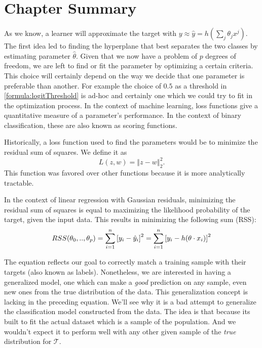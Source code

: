 \section{Chapter Summary}\label{section-ch_machine_learning_summary}


As we know, a learner will approximate the target with $y \approx \hat{y} = h\left(\sum_{j}\theta_j x^j\right)$. The first idea led to finding the hyperplane that best separates the two classes by estimating parameter $\hat{\theta}$. Given that we now have a problem of $p$ degrees of freedom, we are left to find or fit the parameter by optimizing a certain criteria. This choice will certainly depend on the way we decide that one parameter is preferable than another. For example the choice of $0.5$ as a threshold in \cref{formula:logitThreshold} is ad-hoc and certainly one which we could try to fit in the optimization process. In the context of machine learning, loss functions give a quantitative measure of a parameter's performance. In the context of binary classification, these are also known as scoring functions.

Historically, a loss function used to find the parameters would be to minimize the residual sum of squares.
We define it as $$L(z,w) = \left\Vert z-w \right\Vert^2_2 .$$
This function was favored over other functions because it is more analytically tractable.

In the context of linear regression with Gaussian residuals, minimizing the residual sum of squares is equal to maximizing the likelihood probability of the target, given the input data. This results in minimizing the following sum (RSS):
\begin{equation}\label{eq:rss}
RSS(\theta_0,..,\theta_p) = \sum_{i=1}^n {[y_i - \hat{y}_i ] }^2 \\
= \sum_{i=1}^n  {[y_i - h( \theta \cdot x_i)] }^2
\end{equation}

The equation reflects our goal to correctly match a training sample with their targets (also known as labels). Nonetheless, we are interested in having a generalized model, one which can make a \textit{good} prediction on any sample, even new ones from the true distribution of the data.
This generalization concept is lacking in the preceding equation. We'll see why it is a bad attempt to generalize the classification model constructed from the data. The idea is that because its built to fit the actual dataset which is a sample of the population. And we wouldn't expect it to perform well with any other given sample of the \textit{true} distribution for $\mathcal{T}$.
